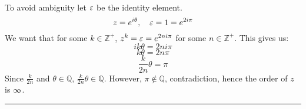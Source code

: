 \documentclass[11pt]{article}
\let\oriinfty=\infty
\def\infty{{\oriinfty\llap{\vrule height.24em depth-.2em width.2em}}}
\begin{document}
\begin{itemize}
    \begin{solution} \hfill \\
        To avoid ambiguity let $\varepsilon$ be the identity element.
        $$z=e^{i\theta}, \quad \varepsilon=1=e^{2i\pi}$$
        We want that for some $k\in \mathbb{Z}^+$, $z^k=\varepsilon=e^{2ni\pi}$ for some $n\in \mathbb{Z}^+$. This gives us:
        $$ik\theta=2ni\pi$$
        $$k\theta=2n\pi$$
        $$\frac{k}{2n}\theta=\pi$$
        Since $\frac{k}{2n}$ and $\theta \in \mathbb{Q}$, $\frac{k}{2n}\theta \in \mathbb{Q}$. However, $\pi \notin \mathbb{Q}$, contradiction,
        hence the order of $z$ is $\infty$.
    \end{solution}
\end{itemize}
\vspace{6pt}
\hrule
\vspace{6pt}
\end{document}
